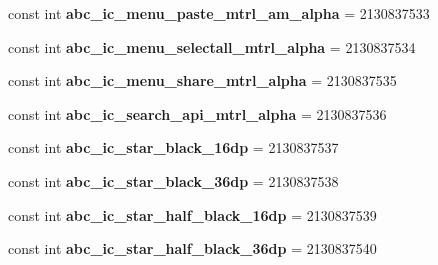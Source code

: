 \begin{DoxyCompactItemize}
const int {\bfseries abc\+\_\+ic\+\_\+menu\+\_\+paste\+\_\+mtrl\+\_\+am\+\_\+alpha} = 2130837533
\item 
\mbox{\label{class_pinned_app_1_1_droid_1_1_resource_1_1_drawable_a418a0a47dd2074db66d94e04a9ec332c}} 
const int {\bfseries abc\+\_\+ic\+\_\+menu\+\_\+selectall\+\_\+mtrl\+\_\+alpha} = 2130837534
\item 
\mbox{\label{class_pinned_app_1_1_droid_1_1_resource_1_1_drawable_a7ed8591bf2916145fc935a1ade5a9015}} 
const int {\bfseries abc\+\_\+ic\+\_\+menu\+\_\+share\+\_\+mtrl\+\_\+alpha} = 2130837535
\item 
\mbox{\label{class_pinned_app_1_1_droid_1_1_resource_1_1_drawable_a8796f45d70e29c92c6f956af14cbc36b}} 
const int {\bfseries abc\+\_\+ic\+\_\+search\+\_\+api\+\_\+mtrl\+\_\+alpha} = 2130837536
\item 
\mbox{\label{class_pinned_app_1_1_droid_1_1_resource_1_1_drawable_a337581f5aa78db44772116ec04db7770}} 
const int {\bfseries abc\+\_\+ic\+\_\+star\+\_\+black\+\_\+16dp} = 2130837537
\item 
\mbox{\label{class_pinned_app_1_1_droid_1_1_resource_1_1_drawable_a6f9c27e0f08329bd273bd054579a2979}} 
const int {\bfseries abc\+\_\+ic\+\_\+star\+\_\+black\+\_\+36dp} = 2130837538
\item 
\mbox{\label{class_pinned_app_1_1_droid_1_1_resource_1_1_drawable_ab47b2a93f4741558e2695608bbefb2dd}} 
const int {\bfseries abc\+\_\+ic\+\_\+star\+\_\+half\+\_\+black\+\_\+16dp} = 2130837539
\item 
\mbox{\label{class_pinned_app_1_1_droid_1_1_resource_1_1_drawable_ac42cc75d92f82e2aa834088bbc26c257}} 
const int {\bfseries abc\+\_\+ic\+\_\+star\+\_\+half\+\_\+black\+\_\+36dp} = 2130837540
\item 
\mbox{\label{class_pinned_app_1_1_droid_1_1_resource_1_1_drawable_a4fa3fa78319e6ee1d0ae2f9b06f95011}} 

\end{DoxyCompactItemize}

